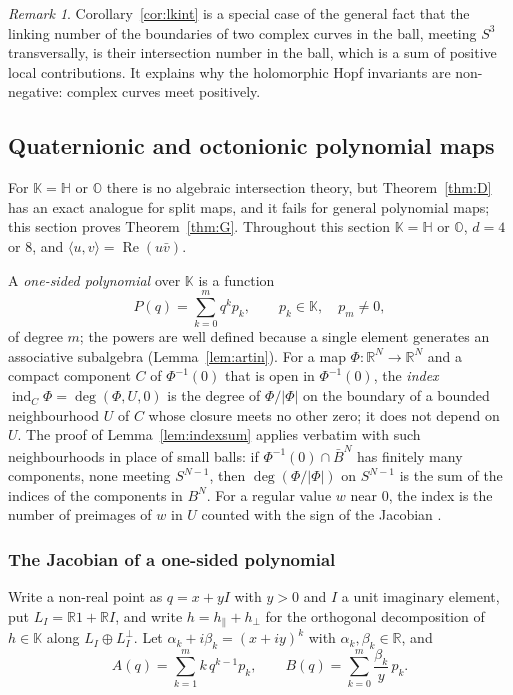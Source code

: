 \documentclass[11pt]{amsart}
\numberwithin{equation}{section}
\theoremstyle{plain}
\theoremstyle{definition}
\theoremstyle{remark}
\newtheorem{remark}[theorem]{Remark}
\newcommand{\R}{\mathbb{R}}
\newcommand{\Hq}{\mathbb{H}}
\newcommand{\Oc}{\mathbb{O}}
\newcommand{\K}{\mathbb{K}}
\renewcommand{\Re}{\operatorname{Re}}
\begin{document}
\begin{remark}
Corollary~\ref{cor:lkint} is a special case of the general fact that the linking number of the boundaries of two complex curves in the ball, meeting $S^3$ transversally, is their intersection number in the ball, which is a sum of positive local contributions. It explains why the holomorphic Hopf invariants are non-negative: complex curves meet positively.
\end{remark}

\subsection{Quaternionic and octonionic polynomial maps}\label{sec:split}

For $\K=\Hq$ or $\Oc$ there is no algebraic intersection theory, but Theorem~\ref{thm:D} has an exact analogue for split maps, and it fails for general polynomial maps; this section proves Theorem~\ref{thm:G}. Throughout this section $\K=\Hq$ or $\Oc$, $d=4$ or $8$, and $\langle u,v\rangle=\Re(u\bar v)$.

A \emph{one-sided polynomial} over $\K$ is a function
\begin{equation}\label{eq:onesided}
P(q)=\sum_{k=0}^mq^kp_k,\qquad p_k\in\K,\quad p_m\neq0,
\end{equation}
of degree $m$; the powers are well defined because a single element generates an associative subalgebra (Lemma~\ref{lem:artin}). For a map $\Phi\colon\R^N\to\R^N$ and a compact component $C$ of $\Phi^{-1}(0)$ that is open in $\Phi^{-1}(0)$, the \emph{index} $\operatorname{ind}_C\Phi=\deg(\Phi,U,0)$ is the degree of $\Phi/|\Phi|$ on the boundary of a bounded neighbourhood $U$ of $C$ whose closure meets no other zero; it does not depend on $U$. The proof of Lemma~\ref{lem:indexsum} applies verbatim with such neighbourhoods in place of small balls: if $\Phi^{-1}(0)\cap\bar B^N$ has finitely many components, none meeting $S^{N-1}$, then $\deg(\Phi/|\Phi|)$ on $S^{N-1}$ is the sum of the indices of the components in $B^N$. For a regular value $w$ near $0$, the index is the number of preimages of $w$ in $U$ counted with the sign of the Jacobian \cite[Section~5]{Mil65}.

\subsubsection{The Jacobian of a one-sided polynomial}

Write a non-real point as $q=x+yI$ with $y>0$ and $I$ a unit imaginary element, put $L_I=\R1+\R I$, and write $h=h_\parallel+h_\perp$ for the orthogonal decomposition of $h\in\K$ along $L_I\oplus L_I^\perp$. Let $\alpha_k+i\beta_k=(x+iy)^k$ with $\alpha_k,\beta_k\in\R$, and
\begin{equation}\label{eq:AB}
A(q)=\sum_{k=1}^mk\,q^{k-1}p_k,\qquad B(q)=\sum_{k=0}^m\frac{\beta_k}{y}\,p_k .
\end{equation}
\end{document}
